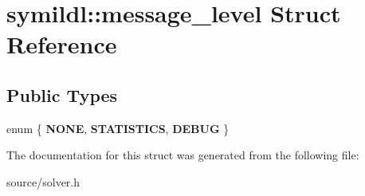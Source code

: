 \hypertarget{structsymildl_1_1message__level}{}\section{symildl\+:\+:message\+\_\+level Struct Reference}
\label{structsymildl_1_1message__level}
\subsection*{Public Types}
\begin{DoxyCompactItemize}
\item 
enum \{ {\bfseries N\+O\+NE}, 
{\bfseries S\+T\+A\+T\+I\+S\+T\+I\+CS}, 
{\bfseries D\+E\+B\+UG}
 \}\hypertarget{structsymildl_1_1message__level_a7466676353ea11d7ae16e29339ab0c71}{}\label{structsymildl_1_1message__level_a7466676353ea11d7ae16e29339ab0c71}

\end{DoxyCompactItemize}


The documentation for this struct was generated from the following file\+:\begin{DoxyCompactItemize}
\item 
source/solver.\+h\end{DoxyCompactItemize}
